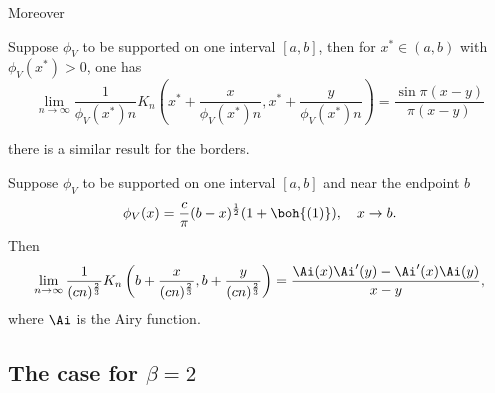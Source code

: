 Moreover

\begin{teorema}
	Suppose $\phi_V$ to be supported on one interval $[a,b]$, then for $x^* \in (a, b)$ with $\phi_V(x^*) > 0$, one has
	\begin{equation}
		\lim_{n \rightarrow \infty} \frac{1}{\phi_V(x^*) n} K_n\left(x^* + \frac{x}{\phi_V(x^*)n}, x^* + \frac{y}{\phi_V(x^*)n}\right) = \frac{\sin \pi(x - y)}{\pi(x - y)}
	\end{equation}
\end{teorema}
there is a similar result for the borders.
\begin{teorema}
	Suppose $\phi_V$ to be supported on one interval $[a,b]$ and near the endpoint $b$
	\begin{equation}
		\phi_V(x) = \frac{c}{\pi} (b-x)^{\frac{1}{2}} (1 + \boh{(1)}), \quad x \rightarrow b.
	\end{equation}
	Then
	\begin{equation}
		\lim_{n \rightarrow \infty} \frac{1}{(cn)^{\frac{2}{3}}} K_n\left(b + \frac{x}{(cn)^{\frac{2}{3}}}, b + \frac{y}{(cn)^{\frac{2}{3}}}\right) = \frac{\Ai(x) \Ai'(y) - \Ai'(x) \Ai(y)}{x - y},
	\end{equation}
	where $\Ai$ is the Airy function.
\end{teorema}


\subsection{The case for $\beta = 2$}
\label{Subsection: The case for beta 2}

